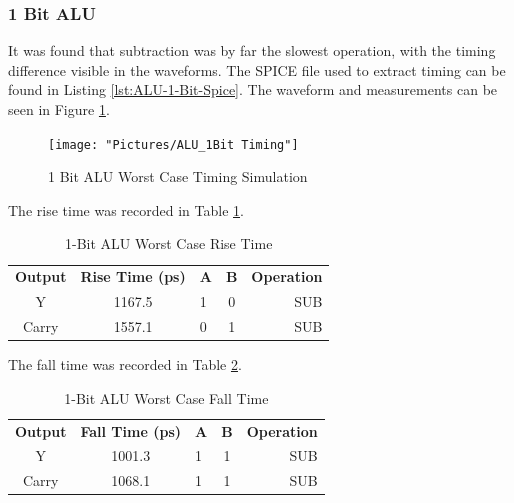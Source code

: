 \documentclass[11pt]{article}
\begin{document}
		\subsubsection{1 Bit ALU}
			It was found that subtraction was by far the slowest operation, with the timing difference visible in the waveforms.  The SPICE file used to extract timing can be found in Listing \ref{lst:ALU-1-Bit-Spice}. The waveform and measurements can be seen in Figure \ref{fig:alu1bit-timing}.
		
			\begin{figure}[H]
				\centering
				\texttt{[image: "Pictures/ALU\_1Bit Timing"]}
				\caption{1 Bit ALU Worst Case Timing Simulation}
				\label{fig:alu1bit-timing}
			\end{figure}
		
			The rise time was recorded in Table \ref{tab:ALU-1-Bit-Risetime}.
			
			\begin{table}[H]
				\centering
				\caption{1-Bit ALU Worst Case Rise Time}
				\label{tab:ALU-1-Bit-Risetime}
				\begin{tabular}{|cclcr|}
					\hline
					\textbf{Output} & \textbf{Rise Time (ps)} & \textbf{A} & \textbf{B} & \textbf{Operation} \\
					Y               & 1167.5                  & 1          & 0          & SUB                \\
					Carry           & 1557.1                  & 0          & 1          & SUB                \\
					         \hline
				\end{tabular}
			\end{table}
		
			The fall time was recorded in Table \ref{tab:ALU-1-Bit-Falltime}.
		
			\begin{table}[H]
				\centering
				\caption{1-Bit ALU Worst Case Fall Time}
				\label{tab:ALU-1-Bit-Falltime}
				\begin{tabular}{|cclcr|}
					\hline
					\textbf{Output} & \textbf{Fall Time (ps)} & \textbf{A} & \textbf{B} & \textbf{Operation} \\
					Y               & 1001.3                  & 1          & 1          & SUB                \\
					Carry           & 1068.1                  & 1          & 1          & SUB                \\
					\hline
				\end{tabular}
			\end{table}
		
\end{document}
